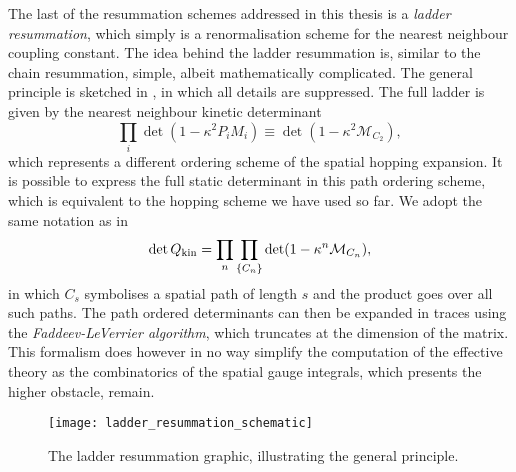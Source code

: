 The last of the resummation schemes addressed in this thesis is a \emph{ladder
resummation}, which simply is a renormalisation scheme for the nearest neighbour
coupling constant. The idea behind the ladder resummation is, similar to the
chain resummation, simple, albeit mathematically complicated. The general
principle is sketched in , in
which all details are suppressed. The full ladder is given by the nearest
neighbour kinetic determinant
%
\begin{equation}
  \prod_i \det (1 - \kappa^2 P_i M_i) \equiv \det (1 - \kappa^2 \mathcal{M}_{C_2}),
\end{equation}
%
which represents a different ordering scheme of the spatial hopping expansion.
It is possible to express the full static determinant in this path ordering
scheme, which is equivalent to the hopping scheme we have used so far. We adopt
the same notation as in \citep{Rindlisbacher:2015pea}
%
\begin{equation}
  \det Q_{\text{kin}} = \prod_{n} \prod_{\{C_n\}} \det(1 - \kappa^n \mathcal{M}_{C_n}),
\end{equation}
%
in which $C_s$ symbolises a spatial path of length $s$ and the product goes over
all such paths. The path ordered determinants can then be expanded in traces
using the \emph{Faddeev-LeVerrier algorithm}, which truncates at the dimension
of the matrix. This formalism does however in no way simplify the computation of
the effective theory as the combinatorics of the spatial gauge integrals, which
presents the higher obstacle, remain.

\begin{figure}[t]
  \begin{center}
    \texttt{[image: ladder\_resummation\_schematic]}
  \end{center}
  \caption{The ladder resummation graphic, illustrating the general principle.}
  \label{fig:ladder_schematic}
\end{figure}

